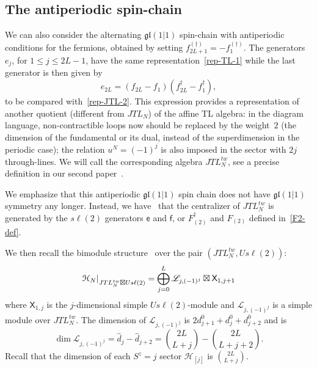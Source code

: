 \documentclass[11pt]{article}
\newcommand{\JTL}[1]{JTL_{#1}}
\newcommand{\f}{\mathsf{f}}
\newcommand{\e}{\mathsf{e}}
\newcommand{\Hilb}{\mathcal{H}}
\newcommand{\gl}{\mathfrak{gl}}
\newcommand{\second}{second }
\newcommand{\XX}{\mathsf{X}}
\newcommand{\AIrrTL}[2]{\mathscr{L}_{#1,#2}}
\theoremstyle{definition}
\begin{document}
\subsection{The antiperiodic spin-chain}\label{subsec:antiper-mod}
We can also consider the alternating $\gl(1|1)$ spin-chain with
antiperiodic conditions for the fermions, obtained by setting
$f^{(\dagger)}_{2L+1}=-f^{(\dagger)}_1$. The generators $e_j$, for
$1\leq j\leq 2L-1$, have the same representation~\eqref{rep-TL-1}
while the last generator is then given by
\begin{equation}\label{rep-JTL-anti}
e_{2L}=(f_{2L}-f_{1})(f_{2L}^\dagger-f_{1}^\dagger),
\end{equation}
to be compared with~\eqref{rep-JTL-2}.
 This expression provides  a
representation of another quotient (different from $\JTL{N}$) of the  affine TL algebra:
in the diagram language, non-contractible loops now should be replaced
 by the weight~$2$ (the
 dimension of the fundamental or its dual, instead of the
 superdimension in the periodic case);
the relation $u^{N}=(-1)^j$ is also imposed in the sector
with $2j$ through-lines.
 We will call the corresponding algebra $\JTL{N}^{tw}$, see a precise
definition in our \second paper~\cite[Sec.~6.2]{GRS2}.

  We emphasize that this antiperiodic $\gl(1|1)$ spin chain does not
have $\gl(1|1)$ symmetry any longer. Instead, we have~\cite[Thm.3.4.1]{GRS1} that
the centralizer of  $\JTL{N}^{tw}$  is generated
 by the $s\ell(2)$ generators $\e$ and $\f$, or $F_{(2)}^\dagger$ and
 $F_{(2)}$ defined in~\eqref{F2-def}.

We then recall  the bimodule structure~\cite[Sec.~6.2]{GRS2} over the pair $(\JTL{N}^{tw},U s\ell(2))$:
\begin{equation}\label{antip-bimod}
\Hilb_N|_{\rule{0pt}{7.5pt}%
\JTL{N}^{tw}\boxtimes U s\ell(2)} = \bigoplus_{j=0}^{L}\AIrrTL{j}{(-1)^j} \boxtimes \XX_{1,j+1}
\end{equation}
where $\XX_{1,j}$ is the $j$-dimensional simple $U s\ell(2)$-module
 and $\AIrrTL{j}{(-1)^j}$ is a simple module over $\JTL{N}^{tw}$.
 The dimension of $\AIrrTL{j}{(-1)^j}$ is $2d^0_{j+1} + d^0_{j} +
d^0_{j+2}$ and is
\begin{equation}\label{dimIrrATL-anti}
\dim \AIrrTL{j}{(-1)^j} = \widehat{d}_j -\widehat{d}_{j+2} = \binom{2L}{L+j} - \binom{2L}{L+j+2}.
\end{equation}
Recall that the dimension of each $S^z=j$ sector $\Hilb_{[j]}$ is $\binom{2L}{L+j}$.
\end{document}
